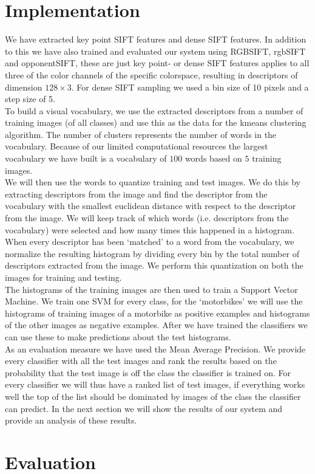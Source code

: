 \documentclass[11pt]{article}
\begin{document}
\section{Implementation}
We have extracted key point SIFT features and dense SIFT features. In addition to this we have also trained and evaluated our system using RGBSIFT, rgbSIFT and opponentSIFT, these are just key point- or dense SIFT features applies to all three of the color channels of the specific colorspace, resulting in descriptors of dimension $128\times3$. For dense SIFT sampling we used a bin size of 10 pixels and a step size of 5. \\
To build a visual vocabulary, we use the extracted descriptors from a number of training images (of all classes) and use this as the data for the kmeans clustering algorithm. The number of clusters represents the number of words in the vocabulary. Because of our limited computational resources the largest vocabulary we have built is a vocabulary of $100$ words based on $5$ training images. \\
We will then use the words to quantize training and test images. We do this by extracting descriptors from the image and find the descriptor from the vocabulary with the smallest euclidean distance with respect to the descriptor from the image. We will keep track of which words (i.e. descriptors from the vocabulary) were selected and how many times this happened in a histogram. When every descriptor has been `matched' to a word from the vocabulary, we normalize the resulting histogram by dividing every bin by the total number of descriptors extracted from the image. We perform this quantization on both the images for training and testing. \\
The histograms of the training images are then used to train a Support Vector Machine. We train one SVM for every class, for the `motorbikes' we will use the histograms of training images of a motorbike as positive examples and histograms of the other images as negative examples. After we have trained the classifiers we can use these to make predictions about the test histograms.\\
As an evaluation measure we have used the Mean Average Precision. We provide every classifier with all the test images and rank the results based on the probability that the test image is off the class the classifier is trained on. For every classifier we will thus have a ranked list of test images, if everything works well the top of the list should be dominated by images of the class the classifier can predict. In the next section we will show the results of our system and provide an analysis of these results. 


\section{Evaluation}


\end{document}

